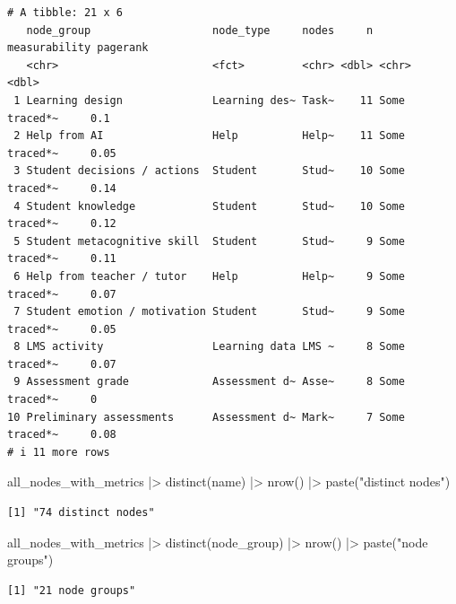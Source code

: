 \documentclass[
  letterpaper,
  DIV=11,
  numbers=noendperiod]{scrartcl}
\newenvironment{Shaded}{\begin{snugshade}}{\end{snugshade}}
\newcommand{\FunctionTok}[1]{\textcolor[rgb]{0.28,0.35,0.67}{#1}}
\newcommand{\NormalTok}[1]{\textcolor[rgb]{0.00,0.23,0.31}{#1}}
\newcommand{\SpecialCharTok}[1]{\textcolor[rgb]{0.37,0.37,0.37}{#1}}
\newcommand{\StringTok}[1]{\textcolor[rgb]{0.13,0.47,0.30}{#1}}
\begin{document}
\begin{verbatim}
# A tibble: 21 x 6
   node_group                   node_type     nodes     n measurability pagerank
   <chr>                        <fct>         <chr> <dbl> <chr>            <dbl>
 1 Learning design              Learning des~ Task~    11 Some traced*~     0.1 
 2 Help from AI                 Help          Help~    11 Some traced*~     0.05
 3 Student decisions / actions  Student       Stud~    10 Some traced*~     0.14
 4 Student knowledge            Student       Stud~    10 Some traced*~     0.12
 5 Student metacognitive skill  Student       Stud~     9 Some traced*~     0.11
 6 Help from teacher / tutor    Help          Help~     9 Some traced*~     0.07
 7 Student emotion / motivation Student       Stud~     9 Some traced*~     0.05
 8 LMS activity                 Learning data LMS ~     8 Some traced*~     0.07
 9 Assessment grade             Assessment d~ Asse~     8 Some traced*~     0   
10 Preliminary assessments      Assessment d~ Mark~     7 Some traced*~     0.08
# i 11 more rows
\end{verbatim}

\begin{Shaded}
\begin{Highlighting}[]
\NormalTok{all\_nodes\_with\_metrics }\SpecialCharTok{|\textgreater{}} 
    \FunctionTok{distinct}\NormalTok{(name) }\SpecialCharTok{|\textgreater{}} 
    \FunctionTok{nrow}\NormalTok{() }\SpecialCharTok{|\textgreater{}} 
    \FunctionTok{paste}\NormalTok{(}\StringTok{"distinct nodes"}\NormalTok{)}
\end{Highlighting}
\end{Shaded}

\begin{verbatim}
[1] "74 distinct nodes"
\end{verbatim}

\begin{Shaded}
\begin{Highlighting}[]
\NormalTok{all\_nodes\_with\_metrics }\SpecialCharTok{|\textgreater{}} 
    \FunctionTok{distinct}\NormalTok{(node\_group) }\SpecialCharTok{|\textgreater{}} 
    \FunctionTok{nrow}\NormalTok{() }\SpecialCharTok{|\textgreater{}} 
    \FunctionTok{paste}\NormalTok{(}\StringTok{"node groups"}\NormalTok{)}
\end{Highlighting}
\end{Shaded}

\begin{verbatim}
[1] "21 node groups"
\end{verbatim}
\end{document}
